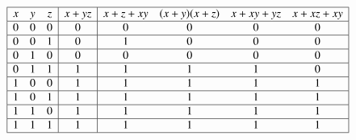 \[
 \begin{array}{|ccc|c|cccc|}
 \hline
x & y & z & x + yz & x+z+xy & (x+y)(x+z) & x+xy+yz & x+xz+xy \\\hline
0 & 0 & 0 & 0 & 0 & 0 & 0 & 0 \\\hline
0 & 0 & 1 & 0 & 1 & 0 & 0 & 0 \\\hline
0 & 1 & 0 & 0 & 0 & 0 & 0 & 0 \\\hline
0 & 1 & 1 & 1 & 1 & 1 & 1 & 0 \\\hline
1 & 0 & 0 & 1 & 1 & 1 & 1 & 1 \\\hline
1 & 0 & 1 & 1 & 1 & 1 & 1 & 1 \\\hline
1 & 1 & 0 & 1 & 1 & 1 & 1 & 1 \\\hline
1 & 1 & 1 & 1 & 1 & 1 & 1 & 1 \\\hline
\end{array}
\]
